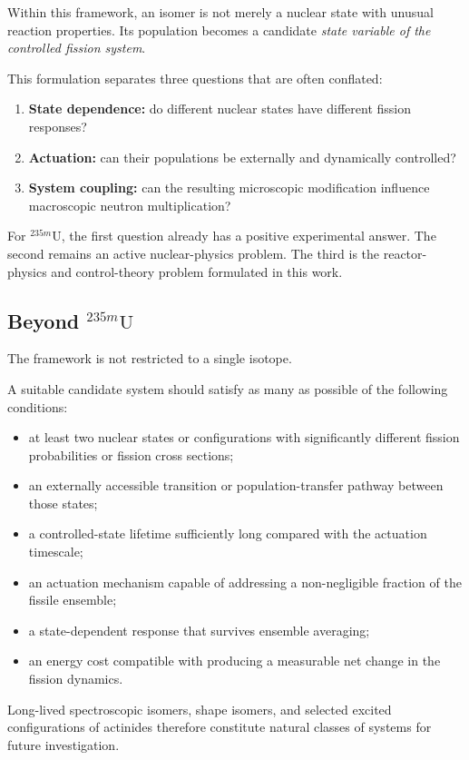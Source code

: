 Within this framework, an isomer is not merely a nuclear state with unusual reaction properties. Its population becomes a candidate \emph{state variable of the controlled fission system}.

This formulation separates three questions that are often conflated:
\begin{enumerate}
\item \textbf{State dependence:} do different nuclear states have different fission responses?
\item \textbf{Actuation:} can their populations be externally and dynamically controlled?
\item \textbf{System coupling:} can the resulting microscopic modification influence macroscopic neutron multiplication?
\end{enumerate}

For $^{235m}\mathrm{U}$, the first question already has a positive experimental answer. The second remains an active nuclear-physics problem. The third is the reactor-physics and control-theory problem formulated in this work.

\subsection{Beyond $^{235m}\mathrm{U}$}

The framework is not restricted to a single isotope.

A suitable candidate system should satisfy as many as possible of the following conditions:
\begin{itemize}
\item at least two nuclear states or configurations with significantly different fission probabilities or fission cross sections;
\item an externally accessible transition or population-transfer pathway between those states;
\item a controlled-state lifetime sufficiently long compared with the actuation timescale;
\item an actuation mechanism capable of addressing a non-negligible fraction of the fissile ensemble;
\item a state-dependent response that survives ensemble averaging;
\item an energy cost compatible with producing a measurable net change in the fission dynamics.
\end{itemize}

Long-lived spectroscopic isomers, shape isomers, and selected excited configurations of actinides therefore constitute natural classes of systems for future investigation.

